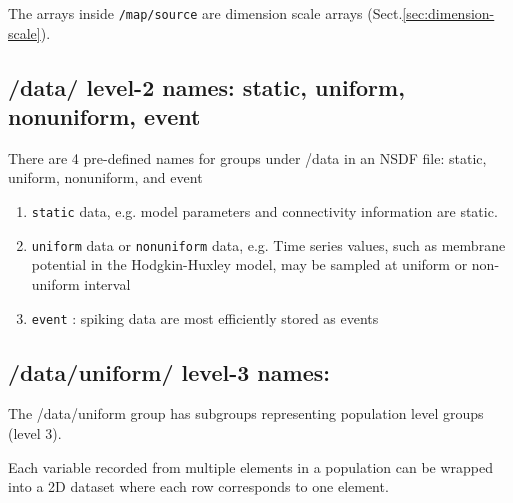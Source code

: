 The arrays inside \verb!/map/source! are dimension scale arrays
(Sect.\ref{sec:dimension-scale}).


\subsection{/data/ level-2 names: static, uniform, nonuniform, event}
\label{sec:NSDF-format-/data/-level-2}

There are 4 pre-defined names for groups under /data in an NSDF file: static,
uniform, nonuniform, and event

\begin{enumerate}
  \item \verb!static! data, e.g. model parameters and connectivity
information are static.


  \item \verb!uniform! data or \verb!nonuniform! data, e.g.
  Time series values, such as membrane potential in the Hodgkin-Huxley model,
  may be sampled at uniform or non-uniform interval
  
  \item \verb!event! : spiking data are most efficiently stored as events

 
\end{enumerate}

\subsection{/data/uniform/ level-3 names: }
\label{sec:NSDF-format-/data/uniform/-level-3}

The /data/uniform group has subgroups representing population level groups
(level 3).

Each variable recorded from multiple elements in a population can be wrapped
into a 2D dataset where each row corresponds to one element.


